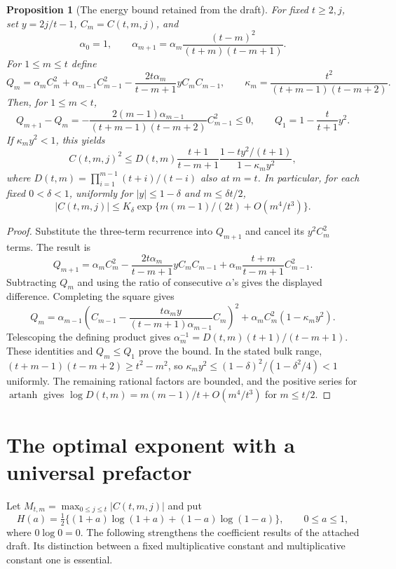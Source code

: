 \documentclass[11pt,a4paper]{article}
\newtheorem{proposition}[theorem]{Proposition}
\theoremstyle{definition}
\theoremstyle{remark}
\numberwithin{equation}{section}
\begin{document}
\begin{proposition}[The energy bound retained from the draft]
\label{p8:cba:energy}
For fixed $t\ge2,j$, set $y=2j/t-1$, $C_m=C(t,m,j)$, and
\[
 \alpha_0=1,\qquad
 \alpha_{m+1}=\alpha_m\frac{(t-m)^2}{(t+m)(t-m+1)}.
\]
For $1\le m\le t$ define
\[
 Q_m=\alpha_m C_m^2+\alpha_{m-1}C_{m-1}^2
       -\frac{2t\alpha_m}{t-m+1}yC_mC_{m-1},\qquad
 \kappa_m=\frac{t^2}{(t+m-1)(t-m+2)}.
\]
Then, for $1\le m<t$,
\[
 Q_{m+1}-Q_m=
 -\frac{2(m-1)\alpha_{m-1}}{(t+m-1)(t-m+2)}C_{m-1}^2\le0,
 \qquad Q_1=1-\frac{t}{t+1}y^2.
\]
If $\kappa_my^2<1$, this yields
\[
 C(t,m,j)^2\le D(t,m)\frac{t+1}{t-m+1}
                \frac{1-ty^2/(t+1)}{1-\kappa_my^2},
\]
where $D(t,m)=\prod_{i=1}^{m-1}(t+i)/(t-i)$ also at $m=t$.
In particular, for each fixed $0<\delta<1$, uniformly for
$|y|\le1-\delta$ and $m\le\delta t/2$,
\[
 |C(t,m,j)|\le K_\delta
       \exp\{m(m-1)/(2t)+O(m^4/t^3)\}.
\]
\end{proposition}
\begin{proof}
Substitute the three-term recurrence into $Q_{m+1}$ and cancel its
$y^2C_m^2$ terms. The result is
\[
 Q_{m+1}=\alpha_m C_m^2
       -\frac{2t\alpha_m}{t-m+1}yC_mC_{m-1}
       +\alpha_m\frac{t+m}{t-m+1}C_{m-1}^2.
\]
Subtracting $Q_m$ and using the ratio of consecutive $\alpha$'s
gives the displayed difference. Completing the square gives
\[
 Q_m=\alpha_{m-1}
 \left(C_{m-1}-\frac{t\alpha_m y}{(t-m+1)\alpha_{m-1}}C_m\right)^2
       +\alpha_m C_m^2(1-\kappa_my^2).
\]
Telescoping the defining product gives
$\alpha_m^{-1}=D(t,m)(t+1)/(t-m+1)$.
These identities and $Q_m\le Q_1$ prove the bound.
In the stated bulk range,
$(t+m-1)(t-m+2)\ge t^2-m^2$, so
$\kappa_my^2\le(1-\delta)^2/(1-\delta^2/4)<1$ uniformly.
The remaining rational factors are bounded, and the positive
series for $\operatorname{artanh}$ gives
$\log D(t,m)=m(m-1)/t+O(m^4/t^3)$ for $m\le t/2$.
\end{proof}



\clearpage

\section{The optimal exponent with a universal prefactor}
\label{p8:cbx:sec}

Let $M_{t,m}=\max_{0\le j\le t}|C(t,m,j)|$ and put
\[
 H(a)=\tfrac12\{(1+a)\log(1+a)+(1-a)\log(1-a)\},
 \qquad 0\le a\le1,
\]
where $0\log0=0$. The following strengthens the coefficient results
of the attached draft. Its distinction between a fixed multiplicative
constant and multiplicative constant one is essential.
\end{document}
